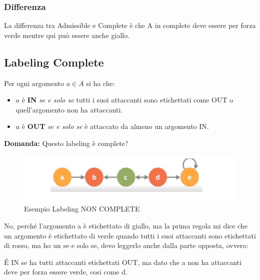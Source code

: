     \subsubsection{\textbf{Differenza}} La differenza tra Admissible e Complete
    è che A in complete deve essere per forza verde mentre qui può essere anche
    giallo.

    \subsection{Labeling Complete}
    Per ogni argomento $a \in A$ si ha che:
    \begin{itemize}
        \item  $a$ è \textbf{IN} \textit{se e solo se} tutti i suoi attaccanti
              sono etichettati come OUT o quell'argomento non ha attaccanti.
        \item $a$ è \textbf{OUT} \textit{se e solo se} è attaccato da almeno un
              argomento IN.
    \end{itemize}
    \textbf{Domanda: } Questo labeling è complete?
    \begin{figure}[H]
        \centering
        \includegraphics[width=12cm, keepaspectratio]{img/Cap7/LC.png}
        \caption{Esempio Labeling NON COMPLETE}
    \end{figure}
    No, perché l'argomento a è etichettato di giallo, ma la prima regola mi
    dice che un argomento è etichettato di verde quando tutti i suoi attaccanti
    sono etichettati di rosso, ma ho un se e solo se, devo leggerlo anche dalla
    parte opposta, ovvero:

    \vspace{0.3cm}
    \noindent É IN se ha tutti attaccanti etichettati OUT, ma dato che a non ha
    attaccanti deve per forza essere verde, cosi come d.

    \vspace{0.3cm}


